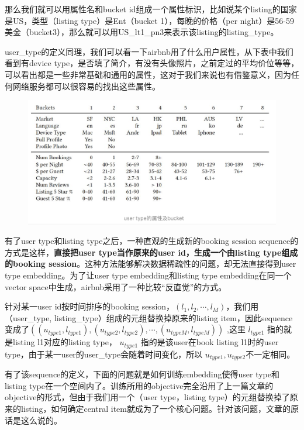 \documentclass[12pt]{article}
\begin{document}
那么我们就可以用属性名和bucket id组成一个属性标识，比如说某个listing的国家是US，类型（listing type）是Ent（bucket 1），每晚的价格（per night）是56-59美金（bucket3），那么就可以用US\_lt1\_pn3来表示该listing的listing\_type。

user\_type的定义同理，我们可以看一下airbnb用了什么用户属性，从下表中我们看到有device type，是否填了简介，有没有头像照片，之前定过的平均价位等等，可以看出都是一些非常基础和通用的属性，这对于我们来说也有借鉴意义，因为任何网络服务都可以很容易的找出这些属性。

\begin{figure}[H]
    \centering
    \includegraphics[width=1\textwidth]{fig/Airbnb_User_Type_And_Buckets.png}
\end{figure}

有了user type和listing type之后，一种直观的生成新的booking session sequence的方式是这样，\textbf{直接把user type当作原来的user id，生成一个由listing type组成的booking session}。这种方法能够解决数据稀疏性的问题，却无法直接得到user type embedding。为了让user type embedding和listing type embedding在同一个vector space中生成，airbnb采用了一种比较“反直觉”的方式。

针对某一user id按时间排序的booking session，$(l_1, l_2, \cdots, l_M)$，我们用（user\_type, listing\_type）组成的元组替换掉原来的listing item，因此sequence变成了$((u_{type1}, l_{type1}), (u_{type2}, l_{type2}), \cdots, (u_{typeM}, l_{typeM}))$ ,这里 $l_{type1}$ 指的就是listing l1对应的listing type， $u_{type1}$ 指的是该user在book listing l1时的user type，由于某一user的user\_type会随着时间变化，所以 $u_{type1}, u_{type2}$不一定相同。

有了该sequence的定义，下面的问题就是如何训练embedding使得user type和listing type在一个空间内了。训练所用的objective完全沿用了上一篇文章的objective的形式，但由于我们用一个（user type，listing type）的元组替换掉了原来的listing，如何确定central item就成为了一个核心问题。针对该问题，文章的原话是这么说的。
\end{document}
